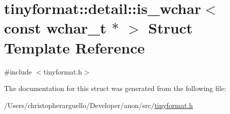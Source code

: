 \hypertarget{structtinyformat_1_1detail_1_1is__wchar_3_01const_01wchar__t_01_5_01_4}{}\section{tinyformat\+:\+:detail\+:\+:is\+\_\+wchar$<$ const wchar\+\_\+t $\ast$ $>$ Struct Template Reference}
\label{structtinyformat_1_1detail_1_1is__wchar_3_01const_01wchar__t_01_5_01_4}


{\ttfamily \#include $<$tinyformat.\+h$>$}



The documentation for this struct was generated from the following file\+:\begin{DoxyCompactItemize}
\item 
/\+Users/christopherarguello/\+Developer/anon/src/\mbox{\hyperlink{tinyformat_8h}{tinyformat.\+h}}\end{DoxyCompactItemize}
